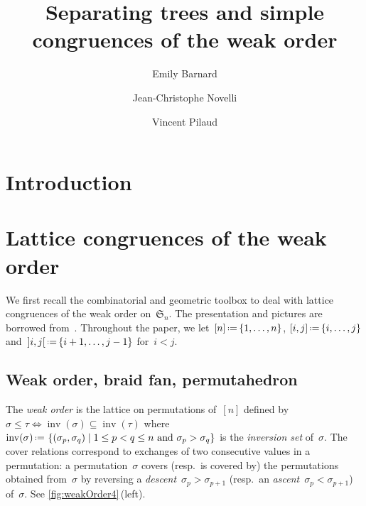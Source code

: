 \documentclass{amsart}
\title[Separating trees and simple comgruences]{Separating trees and simple congruences of the weak order}
\author{Emily Barnard}
\author{Jean-Christophe Novelli}
\author{Vincent Pilaud}
\theoremstyle{definition}
\newcommand{\f}[1]{{\mathfrak{#1}}} %
\newcommand{\set}[2]{\left\{ #1 \;\middle|\; #2 \right\}} %
\newcommand{\eqdef}{\mbox{\,\raisebox{0.2ex}{\scriptsize\ensuremath{\mathrm:}}\ensuremath{=}\,}} %
\DeclareMathOperator{\inv}{inv} %
\newcommand{\darkblue}{\color{darkblue}} %
\newcommand{\defn}[1]{\textsl{\darkblue #1}} %
\begin{document}
\begin{abstract}
\end{abstract}

\maketitle



\section{Introduction}
\label{sec:introduction}


\clearpage
\section{Lattice congruences of the weak order}
\label{sec:latticeCongruences}

We first recall the combinatorial and geometric toolbox to deal with lattice congruences of the weak order on~$\f{S}_n$.
The presentation and pictures are borrowed from~\cite{PilaudSantos-quotientopes, PadrolPilaudRitter}.
Throughout the paper, we let~$[n] \eqdef \{1, \dots, n\}$, $[i,j] \eqdef \{i, \dots, j\}$ and~${{]i,j[} \eqdef \{i+1, \dots, j-1\}}$ for~$i < j$.


\subsection{Weak order, braid fan, permutahedron}
\label{subsec:weakOrder}

The \defn{weak order} is the lattice on permutations of~$[n]$ defined by ${\sigma \le \tau \iff \inv(\sigma) \subseteq \inv(\tau)}$ where~$\inv(\sigma) \eqdef \set{(\sigma_p, \sigma_q)}{1 \le p < q \le n \text{ and } \sigma_p > \sigma_q}$ is the \defn{inversion set} of~$\sigma$.
The cover relations correspond to exchanges of two consecutive values in a permutation: a permutation~$\sigma$ covers (resp.~is covered by) the permutations obtained from~$\sigma$ by reversing a \defn{descent}~$\sigma_p > \sigma_{p+1}$ (resp.~an \defn{ascent}~$\sigma_p < \sigma_{p+1}$) of~$\sigma$.
See \cref{fig:weakOrder4}\,(left).
\end{document}
